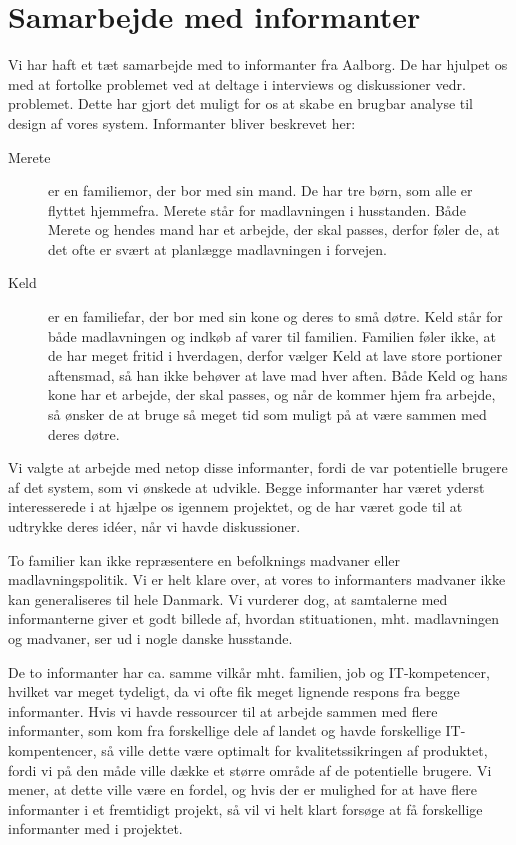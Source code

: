 \chapter{Samarbejde med informanter}
\label{akademiskinformanter}



Vi har haft et tæt samarbejde med to informanter fra Aalborg. De har hjulpet os med at fortolke problemet ved at deltage i interviews og diskussioner vedr. problemet. Dette har gjort det muligt for os at skabe en brugbar analyse til design af vores system. Informanter bliver beskrevet her:

\begin{description}
\item[Merete] er en familiemor, der bor med sin mand. De har tre børn, som alle er flyttet hjemmefra. Merete står for madlavningen i husstanden. Både Merete og hendes mand har et arbejde, der skal passes, derfor føler de, at det ofte er svært at planlægge madlavningen i forvejen.

\item[Keld] er en familiefar, der bor med sin kone og deres to små døtre. Keld står for både madlavningen og indkøb af varer til familien. Familien føler ikke, at de har meget fritid i hverdagen, derfor vælger Keld at lave store portioner aftensmad, så han ikke behøver at lave mad hver aften. Både Keld og hans kone har et arbejde, der skal passes, og når de kommer hjem fra arbejde, så ønsker de at bruge så meget tid som muligt på at være sammen med deres døtre.
\end{description}

Vi valgte at arbejde med netop disse informanter, fordi de var potentielle brugere af det system, som vi ønskede at udvikle. Begge informanter har været yderst interesserede i at hjælpe os igennem projektet, og de har været gode til at udtrykke deres idéer, når vi havde diskussioner.

To familier kan ikke repræsentere en befolknings madvaner eller madlavningspolitik. Vi er helt klare over, at vores to informanters madvaner ikke kan generaliseres til hele Danmark. Vi vurderer dog, at samtalerne med informanterne giver et godt billede af, hvordan stituationen, mht. madlavningen og madvaner, ser ud i nogle danske husstande. 

De to informanter har ca. samme vilkår mht. familien, job og IT-kompetencer, hvilket var meget tydeligt, da vi ofte fik meget lignende respons fra begge informanter. Hvis vi havde ressourcer til at arbejde sammen med flere informanter, som \fx kom fra forskellige dele af landet og havde forskellige IT-kompentencer, så ville dette være optimalt for kvalitetssikringen af produktet, fordi vi på den måde ville dække et større område af de potentielle brugere. Vi mener, at dette ville være en fordel, og hvis der er mulighed for at have flere informanter i et fremtidigt projekt, så vil vi helt klart forsøge at få forskellige informanter med i projektet.

